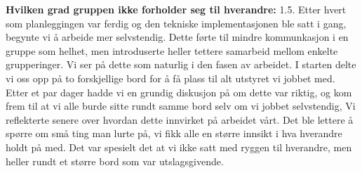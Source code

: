 \noindent \textbf{Hvilken grad gruppen ikke forholder seg til hverandre:} 1.5.
\newline
\noindent Etter hvert som planleggingen var ferdig og den tekniske implementasjonen ble satt i gang, begynte vi å arbeide mer selvstendig. Dette førte til mindre kommunkasjon i en gruppe som helhet, men introduserte heller tettere samarbeid mellom enkelte grupperinger. Vi ser på dette som naturlig i den fasen av arbeidet.
I starten delte vi oss opp på to forskjellige bord for å få plass til alt utstyret vi jobbet med. Etter et par dager hadde vi en grundig diskusjon på om dette var riktig, og kom frem til at vi alle burde sitte rundt samme bord selv om vi jobbet selvstendig, 
Vi reflekterte senere over hvordan dette innvirket på arbeidet vårt. 
Det ble lettere å spørre om små ting man lurte på, vi fikk alle en større innsikt i hva hverandre holdt på med. 
Det var spesielt det at vi ikke satt med ryggen til hverandre, men heller rundt et større bord som var utslagsgivende. 
